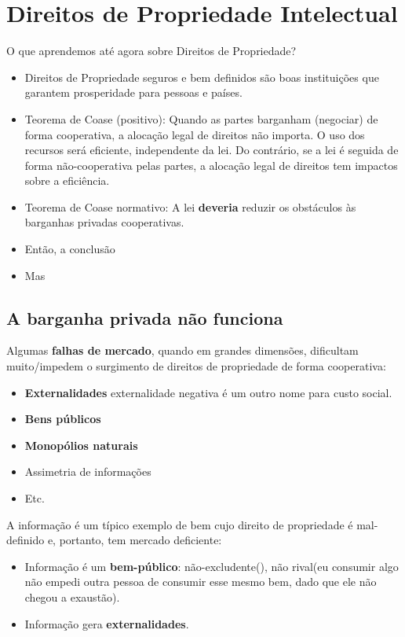 \documentclass[a4paper,12pt]{article}[abntex2]
\begin{document}
\section{\textbf{Direitos de Propriedade Intelectual}}
O que aprendemos até agora sobre Direitos de Propriedade?\begin{itemize}
    \item Direitos de Propriedade seguros e bem definidos são boas instituições que garantem prosperidade para pessoas e países. 
    \item Teorema de Coase (positivo): Quando as partes barganham (negociar) de forma cooperativa, a alocação legal de direitos não importa. O uso dos recursos será eficiente, independente da lei. Do contrário, se a lei é seguida de forma não-cooperativa pelas partes, a alocação legal de direitos tem impactos sobre a eficiência.
    \item Teorema de Coase normativo: A lei \textbf{deveria} reduzir os obstáculos às barganhas privadas cooperativas.
    \item Então, a conclusão
    \item Mas
\end{itemize}

\subsection{\textbf{A barganha privada não funciona}}
Algumas \textbf{falhas de mercado}, quando em grandes dimensões, dificultam muito/impedem o surgimento de direitos de propriedade de forma cooperativa:\begin{itemize}
    \item \textbf{Externalidades} externalidade negativa é um outro nome para custo social.
    \item \textbf{Bens públicos}
    \item \textbf{Monopólios naturais}
    \item Assimetria de informações
    \item Etc.
\end{itemize}

A informação é um típico exemplo de bem cujo direito de propriedade é mal-definido e, portanto, tem mercado deficiente:\begin{itemize}
    \item Informação é um \textbf{bem-público}: não-excludente(), não rival(eu consumir algo não empedi outra pessoa de consumir esse mesmo bem, dado que ele não chegou a exaustão).
    \item Informação gera \textbf{externalidades}.
\end{itemize}
\end{document}
